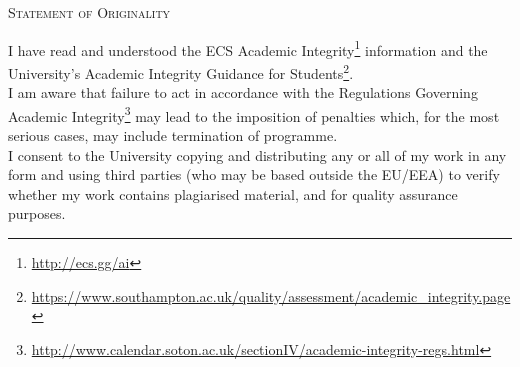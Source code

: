 \documentclass[12pt]{report}
\begin{document}


\newpage


\begin{center}
    \textsc{\LARGE Statement of Originality} \\ [0.3cm]
\end{center}
I have read and understood the ECS Academic Integrity\footnote{\url{http://ecs.gg/ai}} information and the University’s
Academic Integrity Guidance for Students\footnote{\url{https://www.southampton.ac.uk/quality/assessment/academic\_integrity.page}}.
\\[0.3cm]
I am aware that failure to act in accordance with the Regulations Governing Academic Integrity\footnote{\url{http://www.calendar.soton.ac.uk/sectionIV/academic-integrity-regs.html}}
may lead to the imposition of penalties which, for the most serious cases, may include
termination of programme.
\\[0.3cm]
I consent to the University copying and distributing any or all of my work in any form and
using third parties (who may be based outside the EU/EEA) to verify whether my work
contains plagiarised material, and for quality assurance purposes.
\\[-.5cm]
\end{document}
